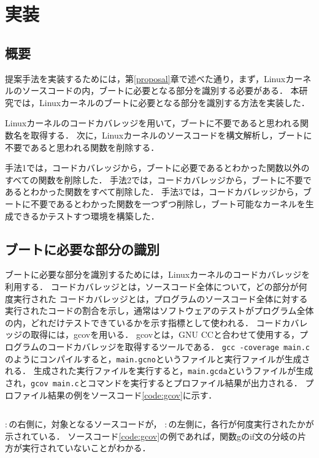 \documentclass[graduation-thesis]{mlarticle}
\begin{document}
\clearpage
\section{実装}
\label{implementation}
\subsection{概要}
\label{implementation:abstruction}
提案手法を実装するためには，第\ref{proposal}章で述べた通り，まず，Linuxカーネルのソースコードの内，ブートに必要となる部分を識別する必要がある．
本研究では，Linuxカーネルのブートに必要となる部分を識別する方法を実装した．

Linuxカーネルのコードカバレッジを用いて，ブートに不要であると思われる関数名を取得する．
次に，Linuxカーネルのソースコードを構文解析し，ブートに不要であると思われる関数を削除する．

手法1では，コードカバレッジから，ブートに必要であるとわかった関数以外のすべての関数を削除した．
手法2では，コードカバレッジから，ブートに不要であるとわかった関数をすべて削除した．
手法3では，コードカバレッジから，ブートに不要であるとわかった関数を一つずつ削除し，ブート可能なカーネルを生成できるかテストすつ環境を構築した．


\subsection{ブートに必要な部分の識別}
\label{implementation:boot}
ブートに必要な部分を識別するためには，Linuxカーネルのコードカバレッジを利用する．
コードカバレッジとは，ソースコード全体について，どの部分が何度実行された
コードカバレッジとは，プログラムのソースコード全体に対する実行されたコードの割合を示し，通常はソフトウェアのテストがプログラム全体の内，どれだけテストできているかを示す指標として使われる．
コードカバレッジの取得には，gcovを用いる．
gcovとは，GNU CCと合わせて使用する，プログラムのコードカバレッジを取得するツールである．
\texttt{gcc -coverage main.c}のようにコンパイルすると，\texttt{main.gcno}というファイルと実行ファイルが生成される．
生成された実行ファイルを実行すると，\texttt{main.gcda}というファイルが生成され，\texttt{gcov main.c}とコマンドを実行するとプロファイル結果が出力される．
プロファイル結果の例をソースコード\ref{code:gcov}に示す．

\begin{lstlisting}[caption=gcovの実行結果例, label=code:gcov]

\end{lstlisting}

$:$の右側に，対象となるソースコードが，
$:$の左側に，各行が何度実行されたかが示されている．
ソースコード\ref{code:gcov}の例であれば，関数gのif文の分岐の片方が実行されていないことがわかる．
\end{document}
